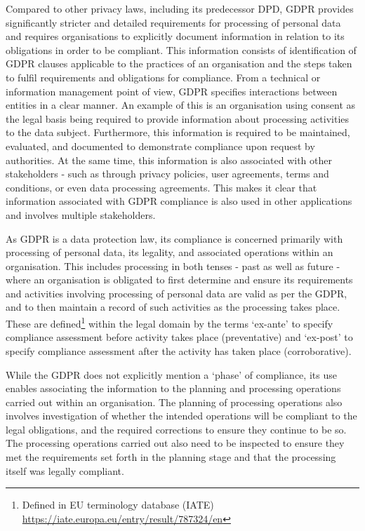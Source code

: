 Compared to other privacy laws, including its predecessor DPD, GDPR provides significantly stricter and detailed requirements for processing of personal data and requires organisations to explicitly document information in relation to its obligations in order to be compliant.
This information consists of identification of GDPR clauses applicable to the practices of an organisation and the steps taken to fulfil requirements and obligations for compliance.
From a technical or information management point of view, GDPR specifies interactions between entities in a clear manner. An example of this is an organisation using consent as the legal basis being required to provide information about processing activities to the data subject. Furthermore, this information is required to be maintained, evaluated, and documented to demonstrate compliance upon request by authorities. At the same time, this information is also associated with other stakeholders - such as through privacy policies, user agreements, terms and conditions, or even data processing agreements. This makes it clear that information associated with GDPR compliance is also used in other applications and involves multiple stakeholders.

As GDPR is a data protection law, its compliance is concerned primarily with processing of personal data, its legality, and associated operations within an organisation. 
This includes processing in both tenses - past as well as future - where an organisation is obligated to first determine and ensure its requirements and activities involving processing of personal data are valid as per the GDPR, and to then maintain a record of such activities as the processing takes place.
These are defined\footnote{Defined in EU terminology database (IATE) \url{https://iate.europa.eu/entry/result/787324/en}} within the legal domain by the terms `ex-ante' to specify compliance assessment before activity takes place (preventative) and `ex-post' to specify compliance assessment after the activity has taken place (corroborative).

While the GDPR does not explicitly mention a `phase' of compliance, its use enables associating the information to the planning and processing operations carried out within an organisation. The planning of processing operations also involves investigation of whether the intended operations will be compliant to the legal obligations, and the required corrections to ensure they continue to be so. The processing operations carried out also need to be inspected to ensure they met the requirements set forth in the planning stage and that the processing itself was legally compliant.

